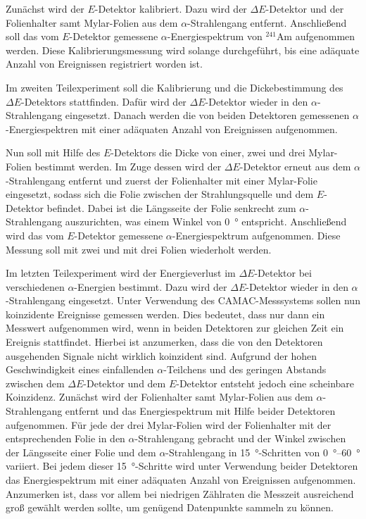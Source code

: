 Zunächst wird der $E$-Detektor kalibriert.
Dazu wird der $\Delta E$-Detektor und der Folienhalter samt Mylar-Folien aus dem $\alpha$-Strahlengang entfernt.
Anschließend soll das vom $E$-Detektor gemessene $\alpha$-Energiespektrum von $^{241}$Am aufgenommen werden.
Diese Kalibrierungsmessung wird solange durchgeführt, bis eine adäquate Anzahl von Ereignissen registriert worden ist.

Im zweiten Teilexperiment soll die Kalibrierung und die Dickebestimmung des $\Delta E$-Detektors stattfinden.
Dafür wird der $\Delta E$-Detektor wieder in den $\alpha$-Strahlengang eingesetzt.
Danach werden die von beiden Detektoren gemessenen $\alpha$-Energiespektren mit einer adäquaten Anzahl von Ereignissen aufgenommen.

Nun soll mit Hilfe des $E$-Detektors die Dicke von einer, zwei und drei Mylar-Folien bestimmt werden.
Im Zuge dessen wird der $\Delta E$-Detektor erneut aus dem $\alpha$-Strahlengang entfernt und zuerst der Folienhalter mit einer Mylar-Folie eingesetzt, sodass sich die Folie zwischen der Strahlungsquelle und dem $E$-Detektor befindet.
Dabei ist die Längsseite der Folie senkrecht zum $\alpha$-Strahlengang auszurichten, was einem Winkel von \SI{0}{\degree} entspricht.
Anschließend wird das vom $E$-Detektor gemessene $\alpha$-Energiespektrum aufgenommen.
Diese Messung soll mit zwei und mit drei Folien wiederholt werden.

Im letzten Teilexperiment wird der Energieverlust im $\Delta E$-Detektor bei verschiedenen $\alpha$-Energien bestimmt.
Dazu wird der $\Delta E$-Detektor wieder in den $\alpha$-Strahlengang eingesetzt.
Unter Verwendung des CAMAC-Messsystems sollen nun koinzidente Ereignisse gemessen werden.
Dies bedeutet, dass nur dann ein Messwert aufgenommen wird, wenn in beiden Detektoren zur gleichen Zeit ein Ereignis stattfindet.
Hierbei ist anzumerken, dass die von den Detektoren ausgehenden Signale nicht wirklich koinzident sind.
Aufgrund der hohen Geschwindigkeit eines einfallenden $\alpha$-Teilchens und des geringen Abstands zwischen dem $\Delta E$-Detektor und dem $E$-Detektor entsteht jedoch eine scheinbare Koinzidenz.
Zunächst wird der Folienhalter samt Mylar-Folien aus dem $\alpha$-Strahlengang entfernt und das Energiespektrum mit Hilfe beider Detektoren aufgenommen.
Für jede der drei Mylar-Folien wird der Folienhalter mit der entsprechenden Folie in den $\alpha$-Strahlengang gebracht und der Winkel zwischen der Längsseite einer Folie und dem $\alpha$-Strahlengang in \SI{15}{\degree}-Schritten von \SIrange{0}{60}{\degree} variiert.
Bei jedem dieser \SI{15}{\degree}-Schritte wird unter Verwendung beider Detektoren das Energiespektrum mit einer adäquaten Anzahl von Ereignissen aufgenommen.
Anzumerken ist, dass vor allem bei niedrigen Zählraten die Messzeit ausreichend groß gewählt werden sollte, um genügend Datenpunkte sammeln zu können.
